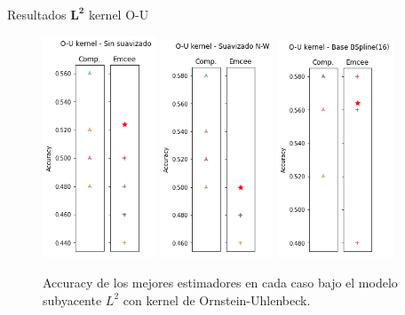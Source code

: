 \documentclass[10pt, professionalfonts]{beamer}
\begin{document}
\begin{frame}{Resultados $\boldsymbol{L^2}$ kernel O-U}
  \begin{figure}
    \includegraphics[width=0.3\textwidth]{img/results-new/clf_l2_ou_none}\hfill
    \includegraphics[width=0.3\textwidth]{img/results-new/clf_l2_ou_nw}\hfill
    \includegraphics[width=0.31\textwidth]{img/results-new/clf_l2_ou_basis}
    \caption{Accuracy de los mejores estimadores en cada caso bajo el modelo subyacente $L^2$ con kernel de Ornstein-Uhlenbeck.}
  \end{figure}
\end{frame}
\end{document}
